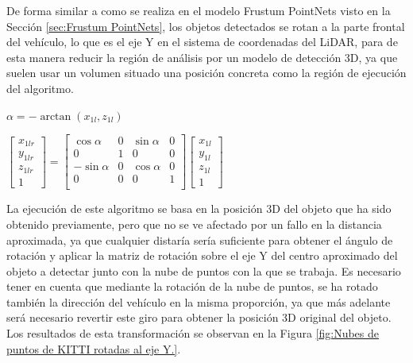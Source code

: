 De forma similar a como se realiza en el modelo Frustum PointNets visto en la Sección \ref{sec:Frustum PointNets}, los objetos detectados se rotan a la parte frontal del vehículo, lo que es el eje Y en el sistema de coordenadas del \ac{LiDAR}, para de esta manera reducir la región de análisis por un modelo de detección 3D, ya que suelen usar un volumen situado una posición concreta como la región de ejecución del algoritmo.

\begin{center}
$\alpha = - \arctan(x_{1l}, z_{1l})$
\end{center}
\begin{center}
$
\begin{bmatrix}
x_{1lr}\\y_{1lr}\\z_{1lr}\\1
\end{bmatrix}
=
\begin{bmatrix}
\cos{\alpha}&0&\sin{\alpha}&0\\
0&1&0&0\\
-\sin{\alpha}&0&\cos{\alpha}&0\\
0&0&0&1\\
\end{bmatrix}
\begin{bmatrix}
x_{1l}\\y_{1l}\\z_{1l}\\1
\end{bmatrix}
$
\end{center}

La ejecución de este algoritmo se basa en la posición 3D del objeto que ha sido obtenido previamente, pero que no se ve afectado por un fallo en la distancia aproximada, ya que cualquier distaría sería suficiente para obtener el ángulo de rotación y aplicar la matriz de rotación sobre el eje Y del centro aproximado del objeto a detectar junto con la nube de puntos con la que se trabaja. Es necesario tener en cuenta que mediante la rotación de la nube de puntos, se ha rotado también la dirección del vehículo en la misma proporción, ya que más adelante será necesario revertir este giro para obtener la posición 3D original del objeto. Los resultados de esta transformación se observan en la Figura \ref{fig:Nubes de puntos de KITTI rotadas al eje Y.}.

